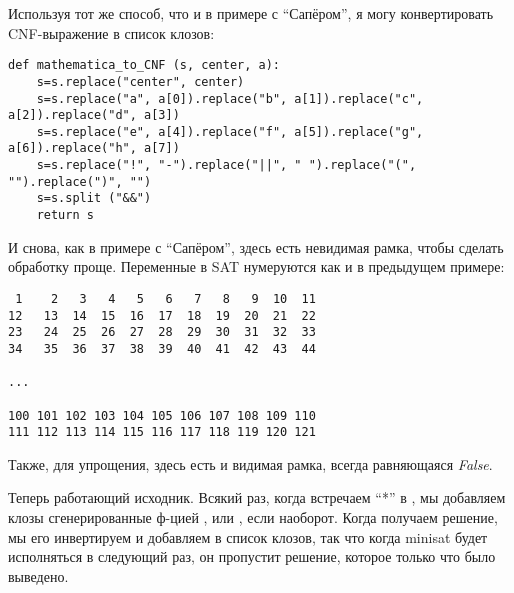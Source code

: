 Используя тот же способ, что и в примере с ``Сапёром'', я могу конвертировать \ac{CNF}-выражение в список клозов:

\begin{lstlisting}
def mathematica_to_CNF (s, center, a):
    s=s.replace("center", center)
    s=s.replace("a", a[0]).replace("b", a[1]).replace("c", a[2]).replace("d", a[3])
    s=s.replace("e", a[4]).replace("f", a[5]).replace("g", a[6]).replace("h", a[7])
    s=s.replace("!", "-").replace("||", " ").replace("(", "").replace(")", "")
    s=s.split ("&&")
    return s
\end{lstlisting}

И снова, как в примере с ``Сапёром'', здесь есть невидимая рамка, чтобы сделать обработку проще.
Переменные в \ac{SAT} нумеруются как и в предыдущем примере:

\begin{lstlisting}
 1    2   3   4   5   6   7   8   9  10  11
12   13  14  15  16  17  18  19  20  21  22
23   24  25  26  27  28  29  30  31  32  33
34   35  36  37  38  39  40  41  42  43  44

...

100 101 102 103 104 105 106 107 108 109 110
111 112 113 114 115 116 117 118 119 120 121
\end{lstlisting}

Также, для упрощения, здесь есть и видимая рамка, всегда равняющаяся \textit{False}.

Теперь работающий исходник.
Всякий раз, когда встречаем ``*'' в , мы добавляем клозы сгенерированные ф-цией
, или , если наоборот.
Когда получаем решение, мы его инвертируем и добавляем в список клозов, так что когда minisat будет исполняться
в следующий раз, он пропустит решение, которое только что было выведено.

